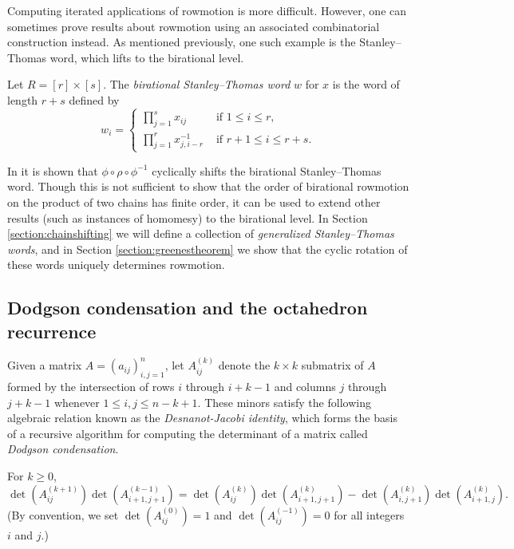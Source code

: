 \documentclass[ALCO,Unicode,published]{cedram}
\numberwithin{equation}{section}
\begin{document}
Computing iterated applications of rowmotion is more difficult. However, one can sometimes prove results about rowmotion using an associated combinatorial construction instead. As mentioned previously, one such example is the Stanley--Thomas word, which lifts to the birational level.

\begin{Def}
Let $R = [r] \times [s]$. The \emph{birational Stanley--Thomas word} $w$ for $x$ is the word of length $r+s$ defined by
\[w_i = \begin{cases} \prod\limits_{j=1}^s x_{ij} &\text{ if } 1\leq i \leq r, \\ \prod\limits_{j=1}^r x_{j,i-r}^{-1} &\text{ if } r+1\leq i \leq r+s.\end{cases}\]
\end{Def}

In \cite{josephroby1} it is shown that $\phi \circ \rho \circ \phi^{-1}$ cyclically shifts the birational Stanley--Thomas word. Though this is not sufficient to show that the order of birational rowmotion on the product of two chains has finite order, it can be used to extend other results (such as instances of homomesy) to the birational level. In Section \ref{section:chainshifting} we  will define a collection of \emph{generalized Stanley--Thomas words}, and in Section \ref{section:greenestheorem} we show that the cyclic rotation of these words uniquely determines rowmotion.

\subsection{Dodgson condensation and the octahedron recurrence} \label{sec:octahedron}

Given a matrix $A=(a_{ij})_{i,j=1}^{n}$, let $A_{ij}^{(k)}$ denote the $k \times k$ submatrix of $A$ formed by the intersection of rows $i$ through $i+k-1$ and columns $j$ through $j+k-1$ whenever $1 \leq i,j \leq n-k+1$. These minors satisfy the following algebraic relation known as the \emph{Desnanot-Jacobi identity}, which forms the basis of a recursive algorithm for computing the determinant of a matrix called \emph{Dodgson condensation}.

\begin{Prop} \label{prop:dodgson}
For $k \geq 0$,
\[\det(A_{ij}^{(k+1)}) \det(A_{i+1,j+1}^{(k-1)})=\det(A_{ij}^{(k)})\det(A_{i+1,j+1}^{(k)})-\det(A_{i,j+1}^{(k)})\det(A_{i+1,j}^{(k)}).\]
(By convention, we set $\det(A_{ij}^{(0)})=1$ and $\det(A_{ij}^{(-1)})=0$ for all integers $i$ and $j$.)
\end{Prop}
\end{document}
